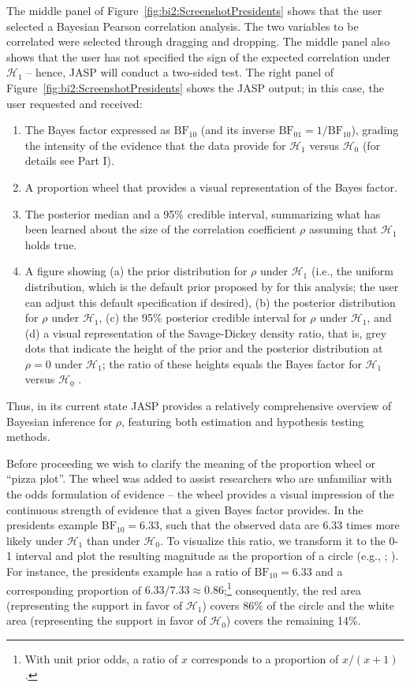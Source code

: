 The middle panel of Figure~\ref{fig:bi2:ScreenshotPresidents} shows that the user selected a Bayesian Pearson correlation analysis. The two variables to be correlated were selected through dragging and dropping. The middle panel also shows that the user has not specified the sign of the expected correlation under $\mathcal{H}_1$ -- hence, JASP will conduct a two-sided test. The right panel of Figure~\ref{fig:bi2:ScreenshotPresidents} shows the JASP output; in this case, the user requested and received:
\begin{enumerate}
\item The Bayes factor expressed as $\text{BF}_{10}$ (and its inverse $\text{BF}_{01} = 1/\text{BF}_{10}$), grading the intensity of the evidence that the data provide for $\mathcal{H}_1$ versus $\mathcal{H}_0$ (for details see Part I).
\item A proportion wheel that provides a visual representation of the Bayes factor.
\item The posterior median and a 95\% credible interval, summarizing what has been learned about the size of the correlation coefficient $\rho$ assuming that $\mathcal{H}_1$ holds true.
\item A figure showing (a) the prior distribution for $\rho$ under $\mathcal{H}_1$ (i.e., the uniform distribution, which is the default prior proposed by  for this analysis; the user can adjust this default specification if desired), (b) the posterior distribution for $\rho$ under $\mathcal{H}_1$, (c) the 95\% posterior credible interval for $\rho$ under $\mathcal{H}_1$, and (d) a visual representation of the Savage-Dickey density ratio, that is, grey dots that indicate the height of the prior and the posterior distribution at $\rho=0$ under $\mathcal{H}_1$; the ratio of these heights equals the Bayes factor for $\mathcal{H}_1$ versus $\mathcal{H}_0$ \cite{DickeyLientz1970,WagenmakersEtAl2010SDPsychologists}.
\end{enumerate}
Thus, in its current state JASP provides a relatively comprehensive overview of Bayesian inference for $\rho$, featuring both estimation and hypothesis testing methods.

Before proceeding we wish to clarify the meaning of the proportion wheel or ``pizza plot''. The wheel was added to assist researchers who are unfamiliar with the odds formulation of evidence -- the wheel provides a visual impression of the continuous strength of evidence that a given Bayes factor provides. In the presidents example $\text{BF}_{10} = 6.33$, such that the observed data are $6.33$ times more likely under $\mathcal{H}_1$ than under $\mathcal{H}_0$. To visualize this ratio, we transform it to the 0-1 interval and plot the resulting magnitude as the proportion of a circle (e.g., ; ). For instance, the presidents example has a ratio of $\text{BF}_{10} = 6.33$ and a corresponding proportion of $6.33/7.33 \approx 0.86$;\footnote{With unit prior odds, a ratio of $x$ corresponds to a proportion of $x/(x+1)$.} consequently, the red area (representing the support in favor of $\mathcal{H}_1$) covers 86\% of the circle and the white area (representing the support in favor of $\mathcal{H}_0$) covers the remaining 14\%.


